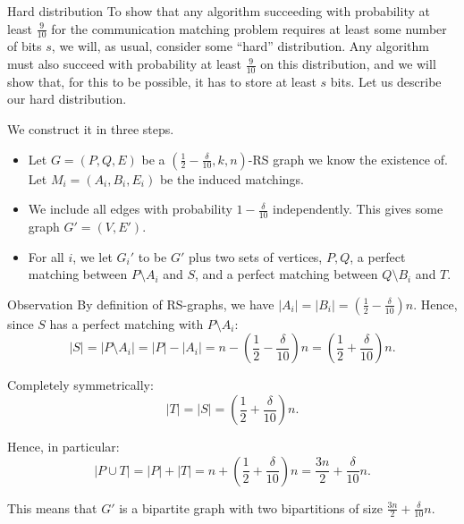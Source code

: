 \documentclass[a4paper]{article}
\begin{document}
\begin{parag}{Hard distribution}
    To show that any algorithm succeeding with probability at least $\frac{9}{10}$ for the communication matching problem requires at least some number of bits $s$, we will, as usual, consider some ``hard'' distribution. Any algorithm must also succeed with probability at least $\frac{9}{10}$ on this distribution, and we will show that, for this to be possible, it has to store at least $s$ bits. Let us describe our hard distribution.

    We construct it in three steps.
    \begin{itemize}[left=0pt]
        \item  Let $G = \left(P, Q, E\right)$ be a $\left(\frac{1}{2} - \frac{\delta}{10}, k, n\right)$-RS graph we know the existence of. Let $M_i = \left(A_i, B_i, E_i\right)$ be the induced matchings.
        \item We include all edges with probability $1 - \frac{\delta}{10}$ independently. This gives some graph $G' = \left(V, E'\right)$.
        \item For all $i$, we let $G_i'$ to be $G'$ plus two sets of vertices, $P, Q$, a perfect matching between $P \setminus A_i$ and $S$, and a perfect matching between $Q \setminus B_i$ and $T$.
    \end{itemize}

    
    \begin{subparag}{Observation}
        By definition of RS-graphs, we have $\left|A_i\right| = \left|B_i\right| = \left(\frac{1}{2} - \frac{\delta}{10}\right)n$. Hence, since $S$ has a perfect matching with $P \setminus A_i$: 
        \[\left|S\right| = \left|P \setminus A_i\right| = \left|P\right| - \left|A_i\right| = n - \left(\frac{1}{2} - \frac{\delta}{10}\right)n = \left(\frac{1}{2} + \frac{\delta}{10}\right)n.\]

        Completely symmetrically: 
        \[\left|T\right| = \left|S\right| = \left(\frac{1}{2} + \frac{\delta}{10}\right)n.\]

        Hence, in particular: 
        \[\left|P \cup T\right| = \left|P\right| + \left|T\right| = n + \left(\frac{1}{2} + \frac{\delta}{10}\right)n = \frac{3n}{2} + \frac{\delta}{10}n.\]
        
        This means that $G'$ is a bipartite graph with two bipartitions of size $\frac{3n}{2} + \frac{\delta}{10}n$.
    \end{subparag}


\end{parag}
\end{document}

